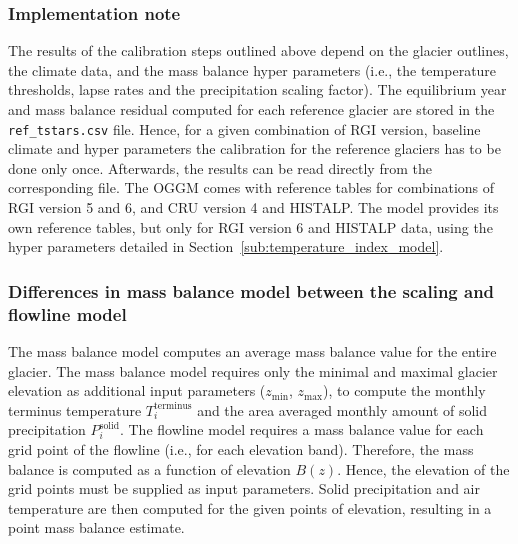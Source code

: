

        \subsubsection{Implementation note} %
        \label{ssub:mb_calib_implementation_note}

            The results of the calibration steps outlined above depend on the glacier outlines, the climate data, and the mass balance hyper parameters (i.e., the temperature thresholds, lapse rates and the precipitation scaling factor). The equilibrium year \tstar{} and mass balance residual \bias{} computed for each reference glacier are stored in the \lstinline`ref_tstars.csv` file. Hence, for a given combination of RGI version, baseline climate and hyper parameters the calibration for the reference glaciers has to be done only once. Afterwards, the results can be read directly from the corresponding file. The OGGM comes with reference tables for combinations of RGI version 5 and 6, and CRU version 4 and HISTALP. The \vas{} model provides its own reference tables, but only for RGI version 6 and HISTALP data, using the hyper parameters detailed in Section~\ref{sub:temperature_index_model}.
        

        \subsubsection{Differences in mass balance model between the scaling and flowline model}

            The \vas{} mass balance model computes an average mass balance value for the entire glacier. The mass balance model requires only the minimal and maximal glacier elevation as additional input parameters ($z_\text{min}$, $z_\text{max}$), to compute the monthly terminus temperature $T_i^\text{terminus}$ and the area averaged monthly amount of solid precipitation $P_i^\text{solid}$. The flowline model requires a mass balance value for each grid point of the flowline (i.e., for each elevation band). Therefore, the mass balance is computed as a function of elevation $B(z)$. Hence, the elevation of the grid points must be supplied as input parameters. Solid precipitation and air temperature are then computed for the given points of elevation, resulting in a point mass balance estimate.
    

